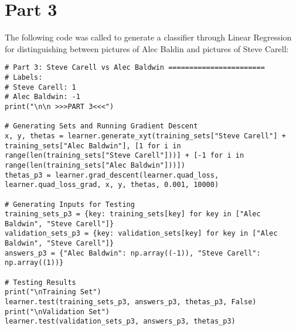 \documentclass[11pt,a4paper]{report}
\begin{document}
\section*{Part 3}
The following code was called to generate a classifier through Linear Regression for distinguishing between pictures of Alec Baldin and pictures of Steve Carell:

\begin{lstlisting}
# Part 3: Steve Carell vs Alec Baldwin =======================
# Labels:
# Steve Carell: 1
# Alec Baldwin: -1
print("\n\n >>>PART 3<<<")

# Generating Sets and Running Gradient Descent
x, y, thetas = learner.generate_xyt(training_sets["Steve Carell"] + training_sets["Alec Baldwin"], [1 for i in range(len(training_sets["Steve Carell"]))] + [-1 for i in range(len(training_sets["Alec Baldwin"]))])
thetas_p3 = learner.grad_descent(learner.quad_loss, learner.quad_loss_grad, x, y, thetas, 0.001, 10000)

# Generating Inputs for Testing
training_sets_p3 = {key: training_sets[key] for key in ["Alec Baldwin", "Steve Carell"]}
validation_sets_p3 = {key: validation_sets[key] for key in ["Alec Baldwin", "Steve Carell"]}
answers_p3 = {"Alec Baldwin": np.array((-1)), "Steve Carell": np.array((1))}

# Testing Results
print("\nTraining Set")
learner.test(training_sets_p3, answers_p3, thetas_p3, False)
print("\nValidation Set")
learner.test(validation_sets_p3, answers_p3, thetas_p3)

\end{lstlisting}
\end{document}
